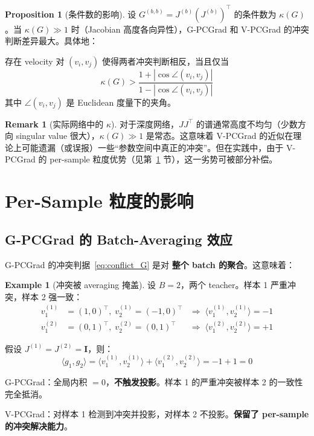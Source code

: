 \documentclass[11pt,a4paper]{article}
\theoremstyle{definition}
\newtheorem{remark}{Remark}
\newtheorem{proposition}{Proposition}
\newtheorem{example}{Example}
\begin{document}
\begin{proposition}[条件数的影响]
\label{prop:condition}
设 $G^{(b,b)} = J^{(b)}(J^{(b)})^\top$ 的条件数为 $\kappa(G)$。当 $\kappa(G) \gg 1$ 时（Jacobian 高度各向异性），G-PCGrad 和 V-PCGrad 的冲突判断差异最大。具体地：

存在 velocity 对 $(v_i, v_j)$ 使得两者冲突判断相反，当且仅当
\begin{equation}
\kappa(G) > \frac{1 + |\cos\angle(v_i, v_j)|}{1 - |\cos\angle(v_i, v_j)|}
\end{equation}
其中 $\angle(v_i, v_j)$ 是 Euclidean 度量下的夹角。
\end{proposition}

\begin{remark}[实际网络中的 $\kappa$]
对于深度网络，$JJ^\top$ 的谱通常高度不均匀（少数方向 singular value 很大），$\kappa(G) \gg 1$ 是常态。这意味着 V-PCGrad 的近似在理论上可能遗漏（或误报）一些``参数空间中真正的冲突''。但在实践中，由于 V-PCGrad 的 per-sample 粒度优势（见第~\ref{sec:per_sample} 节），这一劣势可被部分补偿。
\end{remark}

\section{Per-Sample 粒度的影响}
\label{sec:per_sample}

\subsection{G-PCGrad 的 Batch-Averaging 效应}

G-PCGrad 的冲突判据~\eqref{eq:conflict_G} 是对 \textbf{整个 batch 的聚合}。这意味着：

\begin{example}[冲突被 averaging 掩盖]
设 $B=2$，两个 teacher。样本 1 严重冲突，样本 2 强一致：
\begin{align}
v_1^{(1)} &= (1,0)^\top, \; v_2^{(1)} = (-1, 0)^\top & \Rightarrow\; \langle v_1^{(1)}, v_2^{(1)}\rangle = -1 \\
v_1^{(2)} &= (0,1)^\top, \; v_2^{(2)} = (0, 1)^\top & \Rightarrow\; \langle v_1^{(2)}, v_2^{(2)}\rangle = +1
\end{align}

假设 $J^{(1)} = J^{(2)} = \bm{I}$，则：
\begin{equation}
\langle g_1, g_2\rangle = \langle v_1^{(1)}, v_2^{(1)}\rangle + \langle v_1^{(2)}, v_2^{(2)}\rangle = -1 + 1 = 0
\end{equation}

G-PCGrad：全局内积 $= 0$，\textbf{不触发投影}。样本 1 的严重冲突被样本 2 的一致性完全抵消。

V-PCGrad：对样本 1 检测到冲突并投影，对样本 2 不投影。\textbf{保留了 per-sample 的冲突解决能力}。
\end{example}
\end{document}
